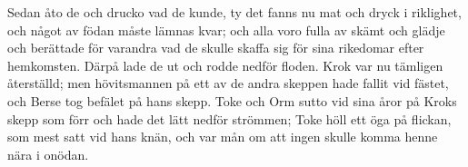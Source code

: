 \initial Sedan åto de och drucko vad de kunde, ty det fanns nu mat och dryck i riklighet, och något av födan måste lämnas kvar; och alla voro fulla av skämt och glädje och berättade för varandra vad de skulle skaffa sig för sina rikedomar efter hemkomsten. Därpå lade de ut och rodde nedför floden. Krok var nu tämligen återställd; men hövitsmannen på ett av de andra skeppen hade fallit vid fästet, och Berse tog befälet på hans skepp. Toke och Orm sutto vid sina åror på Kroks skepp som förr och hade det lätt nedför strömmen; Toke höll ett öga på flickan, som mest satt vid hans knän, och var mån om att ingen skulle komma henne nära i onödan.

\endmulti
